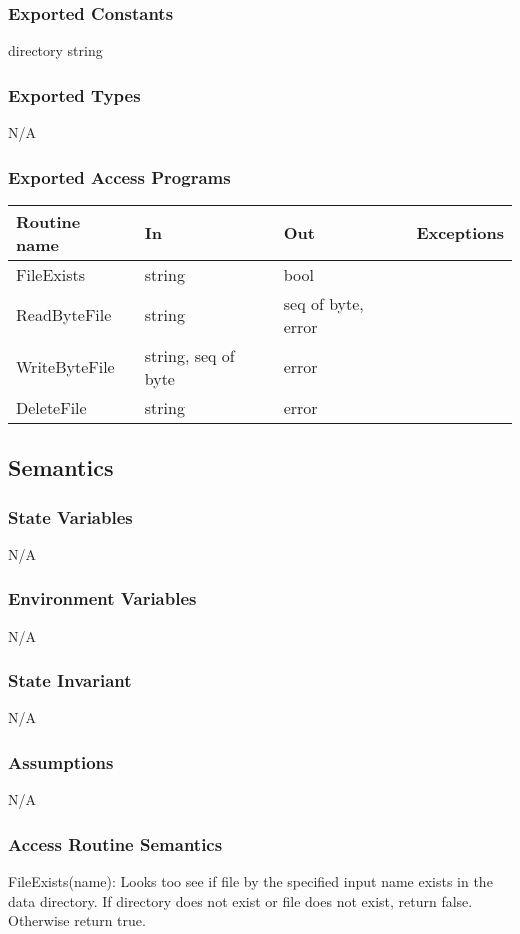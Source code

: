 \documentclass[12pt]{article}
\begin{document}
\subsubsection{Exported Constants}
directory string

\subsubsection{Exported Types}
N/A

\subsubsection{Exported Access Programs}
\begin{tabular}{| l | l | l | l |}
\hline
\textbf{Routine name} & \textbf{In} & \textbf{Out} & \textbf{Exceptions}\\
\hline
FileExists & string & bool & \\
ReadByteFile & string & seq of byte, {\color{red} error} & \\
WriteByteFile & string, seq of byte & {\color{red} error} & \\
DeleteFile & string & {\color{red} error} &\\
\hline
\end{tabular}

\subsection{Semantics}
\subsubsection{State Variables}
N/A
\subsubsection{Environment Variables}
N/A
\subsubsection{State Invariant}
N/A
\subsubsection{Assumptions}
N/A

\subsubsection{Access Routine Semantics}
\noindent FileExists(name): Looks too see if file by the specified input name exists in the data directory. If directory does not exist or file does not exist, return false. Otherwise return true.\\
\end{document}
